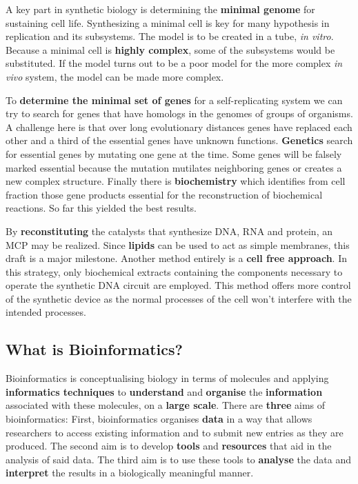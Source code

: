 \documentclass[10pt,a4paper]{report}
\begin{document}
A key part in synthetic biology is determining the \textbf{minimal genome} for sustaining cell life. 
Synthesizing a minimal cell is key for many hypothesis in replication and its subsystems. 
The model is to be created in a tube, \textit{in vitro}. 
Because a minimal cell is \textbf{highly complex}, some of the subsystems would be substituted. 
If the model turns out to be a poor model for the more complex \textit{in vivo} system,  the model can be made more complex.

To \textbf{determine the minimal set of genes} for a self-replicating system we can try to search for genes that have homologs in the genomes of groups of organisms. 
A challenge here is that over long evolutionary distances genes have replaced each other and a third of the essential genes have unknown functions. 
\textbf{Genetics} search for essential genes by mutating one gene at the time. 
Some genes will be falsely marked essential because the mutation mutilates neighboring genes or creates a new complex structure.
Finally there is \textbf{biochemistry} which identifies from cell fraction those gene products essential for the reconstruction of biochemical reactions. 
So far this yielded the best results.

By \textbf{reconstituting} the catalysts that synthesize DNA, RNA and protein, an MCP may be realized. 
Since \textbf{lipids} can be used to act as simple membranes, this draft is a major milestone.
Another method entirely is a \textbf{cell free approach}. 
In this strategy, only biochemical extracts containing the components necessary to operate the synthetic DNA circuit are employed. 
This method offers more control of the synthetic device as the normal processes of the cell won’t interfere with the intended processes.

\subsection*{What is Bioinformatics?}

Bioinformatics is conceptualising biology in terms of molecules and applying \textbf{informatics techniques} to \textbf{understand} and \textbf{organise} the \textbf{information} associated with these molecules, on a \textbf{large scale}. There are \textbf{three} aims of bioinformatics: First, bioinformatics organises \textbf{data} in a way that allows researchers to access existing information and to submit new entries as they are produced. The second aim is to develop \textbf{tools} and \textbf{resources} that aid in the analysis of said data. The third aim is to use these tools to \textbf{analyse} the data and \textbf{interpret} the results in a biologically meaningful manner.
\end{document}
